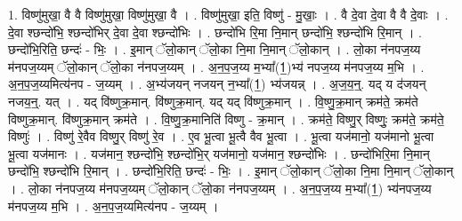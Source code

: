 \documentclass[17pt]{extarticle}
\begin{document}
1. विष्णु॑मुखा॒ वै वै विष्णु॑मुखा॒ विष्णु॑मुखा॒ वै । . विष्णु॑मुखा॒ इति॒ विष्णु॑ - मु॒खाः॒ । . वै दे॒वा दे॒वा वै वै दे॒वाः । . दे॒वा श्छन्दो॑भि॒ श्छन्दो॑भिर् दे॒वा दे॒वा श्छन्दो॑भिः । . छन्दो॑भि रि॒मा नि॒मान् छन्दो॑भि॒ श्छन्दो॑भि रि॒मान् । . छन्दो॑भि॒रिति॒ छन्दः॑ - भिः॒ । . इ॒मान् ॅलो॒कान् ॅलो॒का नि॒मा नि॒मान् ॅलो॒कान् । . लो॒का न॑नपज॒य्य म॑नपज॒य्यम् ॅलो॒कान् ॅलो॒का न॑नपज॒य्यम् । . अ॒न॒प॒ज॒य्य म॒भ्या᳚(1॒)भ्य॑ नपज॒य्य म॑नपज॒य्य म॒भि । . अ॒न॒प॒ज॒य्यमित्य॑नप - ज॒य्यम् । . अ॒भ्य॑जयन् नजयन् न॒भ्या᳚(1॒) भ्य॑जयन्न् । . अ॒ज॒य॒न्॒. यद् य द॑जयन् नजय॒न्॒. यत् । . यद् वि॑ष्णुक्र॒मान्. वि॑ष्णुक्र॒मान्. यद् यद् वि॑ष्णुक्र॒मान् । . वि॒ष्णु॒क्र॒मान् क्रम॑ते॒ क्रम॑ते विष्णुक्र॒मान्. वि॑ष्णुक्र॒मान् क्रम॑ते । . वि॒ष्णु॒क्र॒मानिति॑ विष्णु - क्र॒मान् । . क्रम॑ते॒ विष्णु॒र् विष्णुः॒ क्रम॑ते॒ क्रम॑ते॒ विष्णुः॑ । . विष्णु॑ रे॒वैव विष्णु॒र् विष्णु॑ रे॒व । . ए॒व भू॒त्वा भू॒त्वै वैव भू॒त्वा । . भू॒त्वा यज॑मानो॒ यज॑मानो भू॒त्वा भू॒त्वा यज॑मानः । . यज॑मान॒ श्छन्दो॑भि॒ श्छन्दो॑भि॒र् यज॑मानो॒ यज॑मान॒ श्छन्दो॑भिः । . छन्दो॑भिरि॒मा नि॒मान् छन्दो॑भि॒ श्छन्दो॑भि रि॒मान् । . छन्दो॑भि॒रिति॒ छन्दः॑ - भिः॒ । . इ॒मान् ॅलो॒कान् ॅलो॒का नि॒मा नि॒मान् ॅलो॒कान् । . लो॒का न॑नपज॒य्य म॑नपज॒य्यम् ॅलो॒कान् ॅलो॒का न॑नपज॒य्यम् । . अ॒न॒प॒ज॒य्य म॒भ्या᳚(1॒) भ्य॑नपज॒य्य म॑नपज॒य्य म॒भि । . अ॒न॒प॒ज॒य्यमित्य॑नप - ज॒य्यम् । \newline
\end{document}
